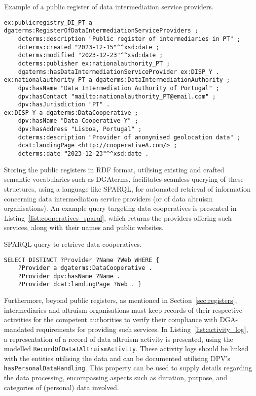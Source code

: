 \begin{listing}[ht]
\caption[Public register of data intermediation service providers.]{Example of a public register of data intermediation service providers.}
\label{list:intermediary_register}
\begin{verbatim}
ex:publicregistry_DI_PT a dgaterms:RegisterOfDataIntermediationServiceProviders ;
    dcterms:description "Public register of intermediaries in PT" ;
    dcterms:created "2023-12-15"^^xsd:date ; 
    dcterms:modified "2023-12-23"^^xsd:date ;
    dcterms:publisher ex:nationalauthority_PT ;
    dgaterms:hasDataIntermediationServiceProvider ex:DISP_Y .
ex:nationalauthority_PT a dgaterms:DataIntermediationAuthority ;
    dpv:hasName "Data Intermediation Authority of Portugal" ;
    dpv:hasContact "mailto:nationalauthority_PT@email.com" ;
    dpv:hasJurisdiction "PT" .
ex:DISP_Y a dgaterms:DataCooperative ;
    dpv:hasName "Data Cooperative Y" ;
    dpv:hasAddress "Lisboa, Portugal" ;
    dcterms:description "Provider of anonymised geolocation data" ;
    dcat:landingPage <http://cooperativeA.com/> ;
    dcterms:date "2023-12-23"^^xsd:date .
\end{verbatim}
\end{listing}

Storing the public registers in RDF format, utilising existing and crafted semantic vocabularies such as DGAterms, facilitates seamless querying of these structures, using a language like SPARQL, for automated retrieval of information concerning data intermediation service providers (or of data altruism organisations).
An example query targeting data cooperatives is presented in Listing~\ref{list:cooperatives_sparql}, which returns the providers offering such services, along with their names and public websites.

\begin{listing}[ht]
\caption{SPARQL query to retrieve data cooperatives.}
\label{list:cooperatives_sparql}
\begin{verbatim}
SELECT DISTINCT ?Provider ?Name ?Web WHERE {
    ?Provider a dgaterms:DataCooperative .
    ?Provider dpv:hasName ?Name .
    ?Provider dcat:landingPage ?Web . }
\end{verbatim}
\end{listing}

Furthermore, beyond public registers, as mentioned in Section~\ref{sec:registers}, intermediaries and altruism organisations must keep records of their respective activities for the competent authorities to verify their compliance with DGA-mandated requirements for providing such services.
In Listing~\ref{list:activity_log}, a representation of a record of data altruism activity is presented, using the modelled \texttt{RecordOfDataIAltruismActivity}.
These activity logs should be linked with the entities utilising the data and can be documented utilising DPV's \texttt{hasPersonalDataHandling}. 
This property can be used to supply details regarding the data processing, encompassing aspects such as duration, purpose, and categories of (personal) data involved.

